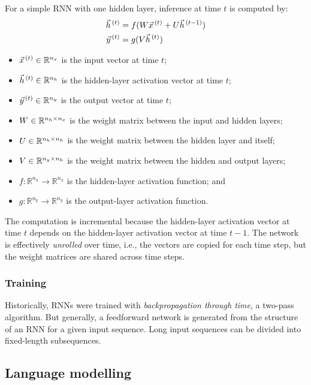 For a simple RNN with one hidden layer, inference at time $t$ is computed by:
\begin{align}
  \vec{h}^{\,(t)} & = f(W \vec{x}^{\,(t)} + U \vec{h}^{\,(t - 1)})
  \\
  \vec{y}^{\,(t)} & = g(V \vec{h}^{\,(t)})
\end{align}
\begin{itemize}
  \item $\vec{x}^{\,(t)} \in \mathbb{R}^{n_x}$ is the input vector at time $t$;
  \item $\vec{h}^{\,(t)} \in \mathbb{R}^{n_h}$ is the hidden-layer activation vector at time $t$;
  \item $\vec{y}^{\,(t)} \in \mathbb{R}^{n_y}$ is the output vector at time $t$;
  \item $W \in \mathbb{R}^{n_h \times n_x}$ is the weight matrix between the input and hidden layers;
  \item $U \in \mathbb{R}^{n_h \times n_h}$ is the weight matrix between the hidden layer and itself;
  \item $V \in \mathbb{R}^{n_y \times n_h}$ is the weight matrix between the hidden and output layers;
  \item $f : \mathbb{R}^{n_h} \to \mathbb{R}^{n_h}$ is the hidden-layer activation function; and
  \item $g : \mathbb{R}^{n_y} \to \mathbb{R}^{n_y}$ is the output-layer activation function.
\end{itemize}
The computation is incremental because the hidden-layer activation vector at
time $t$ depends on the hidden-layer activation vector at time $t - 1$.
The network is effectively \textit{unrolled} over time, i.e., the vectors are
copied for each time step, but the weight matrices are shared across time
steps.

\subsubsection{Training}

Historically, RNNs were trained with \textit{backpropagation through time}, a
two-pass algorithm.
But generally, a feedforward network is generated from the structure of an RNN
for a given input sequence.
Long input sequences can be divided into fixed-length subsequences.

\subsection{Language modelling}
\label{sec:9:rnn-lm}

